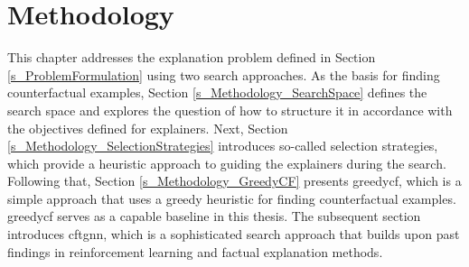 \section{Methodology}
\label{s_Methodology}

This chapter addresses the explanation problem defined in Section \ref{s_ProblemFormulation} using two search approaches. As the basis for finding counterfactual examples, Section \ref{s_Methodology_SearchSpace} defines the search space and explores the question of how to structure it in accordance with the objectives defined for explainers. Next, Section \ref{s_Methodology_SelectionStrategies} introduces so-called selection strategies, which provide a heuristic approach to guiding the explainers during the search. Following that, Section \ref{s_Methodology_GreedyCF} presents \gls{greedycf}, which is a simple approach that uses a greedy heuristic for finding counterfactual examples. \gls{greedycf} serves as a capable baseline in this thesis. The subsequent section introduces \gls{cftgnn}, which is a sophisticated search approach that builds upon past findings in reinforcement learning and factual explanation methods.




